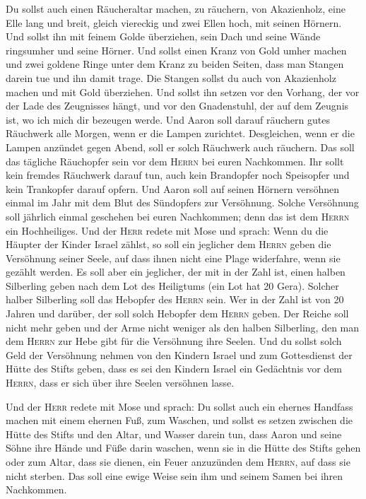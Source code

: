 Du sollst auch einen Räucheraltar machen, zu räuchern,
von Akazienholz,  eine Elle lang und breit, gleich
viereckig und zwei Ellen hoch, mit seinen Hörnern.  Und
sollst ihn mit feinem Golde überziehen, sein Dach und seine Wände
ringsumher und seine Hörner. Und sollst einen Kranz von Gold umher
machen  und zwei goldene Ringe unter dem Kranz zu beiden
Seiten, dass man Stangen darein tue und ihn damit trage. 
Die Stangen sollst du auch von Akazienholz machen und mit Gold
überziehen.  Und sollst ihn setzen vor den Vorhang, der
vor der Lade des Zeugnisses hängt, und vor den Gnadenstuhl, der auf dem
Zeugnis ist, wo ich mich dir bezeugen werde.  Und Aaron
soll darauf räuchern gutes Räuchwerk alle Morgen, wenn er die Lampen
zurichtet.  Desgleichen, wenn er die Lampen anzündet gegen
Abend, soll er solch Räuchwerk auch räuchern. Das soll das tägliche
Räuchopfer sein vor dem \textsc{Herrn} bei euren Nachkommen.
 Ihr sollt kein fremdes Räuchwerk darauf tun, auch kein
Brandopfer noch Speisopfer und kein Trankopfer darauf opfern.
 Und Aaron soll auf seinen Hörnern versöhnen einmal im
Jahr mit dem Blut des Sündopfers zur Versöhnung. Solche Versöhnung soll
jährlich einmal geschehen bei euren Nachkommen; denn das ist dem
\textsc{Herrn} ein Hochheiliges.  Und der \textsc{Herr}
redete mit Mose und sprach:  Wenn du die Häupter der
Kinder Israel zählst, so soll ein jeglicher dem \textsc{Herrn} geben die
Versöhnung seiner Seele, auf dass ihnen nicht eine Plage widerfahre,
wenn sie gezählt werden.  Es soll aber ein jeglicher, der
mit in der Zahl ist, einen halben Silberling geben nach dem Lot des
Heiligtums (ein Lot hat 20 Gera). Solcher halber Silberling soll das
Hebopfer des \textsc{Herrn} sein.  Wer in der Zahl ist
von 20 Jahren und darüber, der soll solch Hebopfer dem \textsc{Herrn}
geben.  Der Reiche soll nicht mehr geben und der Arme
nicht weniger als den halben Silberling, den man dem \textsc{Herrn} zur
Hebe gibt für die Versöhnung ihre Seelen.  Und du sollst
solch Geld der Versöhnung nehmen von den Kindern Israel und zum
Gottesdienst der Hütte des Stifts geben, dass es sei den Kindern Israel
ein Gedächtnis vor dem \textsc{Herrn}, dass er sich über ihre Seelen
versöhnen lasse.

 Und der \textsc{Herr} redete mit Mose und sprach:
 Du sollst auch ein ehernes Handfass machen mit einem
ehernen Fuß, zum Waschen, und sollst es setzen zwischen die Hütte des
Stifts und den Altar, und Wasser darein tun,  dass Aaron
und seine Söhne ihre Hände und Füße darin waschen,  wenn
sie in die Hütte des Stifts gehen oder zum Altar, dass sie dienen, ein
Feuer anzuzünden dem \textsc{Herrn},  auf dass sie nicht
sterben. Das soll eine ewige Weise sein ihm und seinem Samen bei ihren
Nachkommen.

